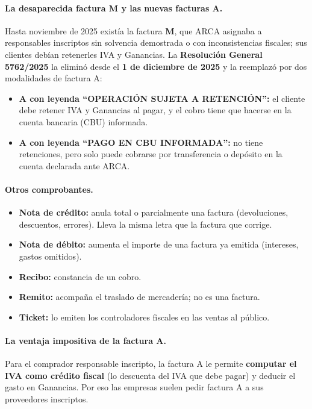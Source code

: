 \paragraph*{La desaparecida factura M y las nuevas facturas A.}
Hasta noviembre de 2025 existía la factura \textbf{M}, que ARCA asignaba a responsables
inscriptos sin solvencia demostrada o con inconsistencias fiscales; sus clientes debían
retenerles IVA y Ganancias. La \textbf{Resolución General 5762/2025} la eliminó desde el
\textbf{1 de diciembre de 2025} y la reemplazó por dos modalidades de factura A:
\begin{itemize}
  \item \textbf{A con leyenda ``OPERACIÓN SUJETA A RETENCIÓN'':} el cliente debe retener IVA
        y Ganancias al pagar, y el cobro tiene que hacerse en la cuenta bancaria (CBU)
        informada.
  \item \textbf{A con leyenda ``PAGO EN CBU INFORMADA'':} no tiene retenciones, pero solo
        puede cobrarse por transferencia o depósito en la cuenta declarada ante ARCA.
\end{itemize}

\paragraph*{Otros comprobantes.}
\begin{itemize}
  \item \textbf{Nota de crédito:} anula total o parcialmente una factura (devoluciones,
        descuentos, errores). Lleva la misma letra que la factura que corrige.
  \item \textbf{Nota de débito:} aumenta el importe de una factura ya emitida (intereses,
        gastos omitidos).
  \item \textbf{Recibo:} constancia de un cobro.
  \item \textbf{Remito:} acompaña el traslado de mercadería; no es una factura.
  \item \textbf{Ticket:} lo emiten los controladores fiscales en las ventas al público.
\end{itemize}

\paragraph*{La ventaja impositiva de la factura A.}
Para el comprador responsable inscripto, la factura A le permite \textbf{computar el IVA
como crédito fiscal} (lo descuenta del IVA que debe pagar) y deducir el gasto en
Ganancias. Por eso las empresas suelen pedir factura A a sus proveedores inscriptos.

